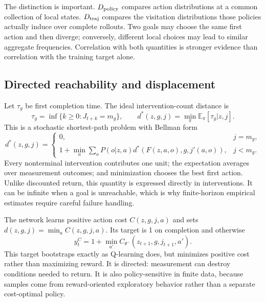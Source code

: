 \documentclass[11pt]{article}
\newcommand{\E}{\mathbb E}
\begin{document}
The distinction is important. $D_{\rm policy}$ compares action distributions
at a common collection of local states. $D_{\rm traj}$ compares the visitation
distributions those policies actually induce over complete rollouts. Two goals
may choose the same first action and then diverge; conversely, different local
choices may lead to similar aggregate frequencies. Correlation with both
quantities is stronger evidence than correlation with the training target
alone.

\subsection{Directed reachability and displacement}

Let $\tau_g$ be first completion time. The ideal intervention-count distance is
\begin{equation}
 \tau_g=\inf\{k\geq0:J_{t+k}=m_g\},\qquad
 d^*(z,g,j)=\min_\pi\E_\pi[\tau_g|z,j]. \label{eq:hitting}
\end{equation}
This is a stochastic shortest-path problem \cite{bertsekas1991} with Bellman
form
\begin{equation}
 d^*(z,g,j)=
 \begin{cases}
 0,&j=m_g,\\
 1+\displaystyle\min_a\sum_oP(o|z,a)
 d^*(F(z,a,o),g,j'(a,o)),&j<m_g.
 \end{cases}
 \label{eq:costbellman}
\end{equation}
Every nonterminal intervention contributes one unit; the expectation averages
over measurement outcomes; and minimization chooses the best first action.
Unlike discounted return, this quantity is expressed directly in
interventions. It can be infinite when a goal is unreachable, which is why
finite-horizon empirical estimates require careful failure handling.

The network learns positive action cost $C(z,g,j,a)$ and sets
$d(z,g,j)=\min_a C(z,g,j,a)$. Its target is 1 on completion and otherwise
\begin{equation}
 y_t^C=1+\min_{a'}C_{\theta^-}(z_{t+1},g,j_{t+1},a'). \label{eq:costtarget}
\end{equation}
This target bootstraps exactly as Q-learning does, but minimizes positive cost
rather than maximizing reward. It is directed: measurement can destroy
conditions needed to return. It is also policy-sensitive in finite data,
because samples come from reward-oriented exploratory behavior rather than a
separate cost-optimal policy.
\end{document}
